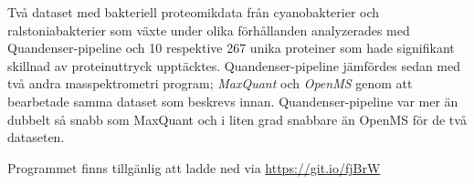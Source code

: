 Två dataset med bakteriell proteomikdata från cyanobakterier och ralstoniabakterier som växte under olika förhållanden analyzerades med Quandenser-pipeline och 10 respektive 267 unika proteiner som hade signifikant skillnad av proteinuttryck upptäcktes. Quandenser-pipeline jämfördes sedan med två andra masspektrometri program; \textit{MaxQuant} och \textit{OpenMS} genom att bearbetade samma dataset som beskrevs innan. Quandenser-pipeline var mer än dubbelt så snabb som MaxQuant och i liten grad snabbare än OpenMS för de två dataseten.

Programmet finns tillgänlig att ladde ned via \url{https://git.io/fjBrW}
